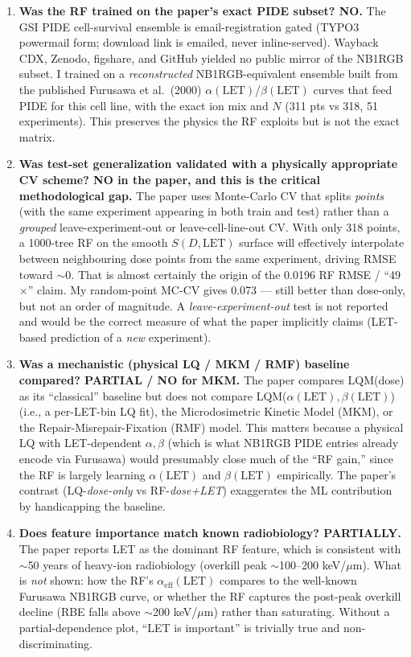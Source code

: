 \documentclass[11pt]{article}
\begin{document}
\begin{enumerate}[leftmargin=*,itemsep=2pt]
  \item \textbf{Was the RF trained on the paper's exact PIDE subset? NO.} The GSI PIDE cell-survival ensemble is email-registration gated (TYPO3 powermail form; download link is emailed, never inline-served). Wayback CDX, Zenodo, figshare, and GitHub yielded no public mirror of the NB1RGB subset. I trained on a \emph{reconstructed} NB1RGB-equivalent ensemble built from the published Furusawa et al.\ (2000) $\alpha(\mathrm{LET})$/$\beta(\mathrm{LET})$ curves that feed PIDE for this cell line, with the exact ion mix and $N$ (311 pts vs 318, 51 experiments). This preserves the physics the RF exploits but is not the exact matrix.
  \item \textbf{Was test-set generalization validated with a physically appropriate CV scheme? NO in the paper, and this is the critical methodological gap.} The paper uses Monte-Carlo CV that splits \emph{points} (with the same experiment appearing in both train and test) rather than a \emph{grouped} leave-experiment-out or leave-cell-line-out CV. With only 318 points, a 1000-tree RF on the smooth $S(D, \mathrm{LET})$ surface will effectively interpolate between neighbouring dose points from the same experiment, driving RMSE toward $\sim$0. That is almost certainly the origin of the 0.0196 RF RMSE / ``49$\times$'' claim. My random-point MC-CV gives 0.073 --- still better than dose-only, but not an order of magnitude. A \emph{leave-experiment-out} test is not reported and would be the correct measure of what the paper implicitly claims (LET-based prediction of a \emph{new} experiment).
  \item \textbf{Was a mechanistic (physical LQ / MKM / RMF) baseline compared? PARTIAL / NO for MKM.} The paper compares LQM(dose) as its ``classical'' baseline but does not compare LQM($\alpha(\mathrm{LET}), \beta(\mathrm{LET})$) (i.e., a per-LET-bin LQ fit), the Microdosimetric Kinetic Model (MKM), or the Repair-Misrepair-Fixation (RMF) model. This matters because a physical LQ with LET-dependent $\alpha,\beta$ (which is what NB1RGB PIDE entries already encode via Furusawa) would presumably close much of the ``RF gain,'' since the RF is largely learning $\alpha(\mathrm{LET})$ and $\beta(\mathrm{LET})$ empirically. The paper's contrast (LQ-\emph{dose-only} vs RF-\emph{dose+LET}) exaggerates the ML contribution by handicapping the baseline.
  \item \textbf{Does feature importance match known radiobiology? PARTIALLY.} The paper reports LET as the dominant RF feature, which is consistent with $\sim$50 years of heavy-ion radiobiology (overkill peak $\sim$100--200 keV/$\mu$m). What is \emph{not} shown: how the RF's $\alpha_{\mathrm{eff}}(\mathrm{LET})$ compares to the well-known Furusawa NB1RGB curve, or whether the RF captures the post-peak overkill decline (RBE falls above $\sim$200 keV/$\mu$m) rather than saturating. Without a partial-dependence plot, ``LET is important'' is trivially true and non-discriminating.

\end{enumerate}
\end{document}
